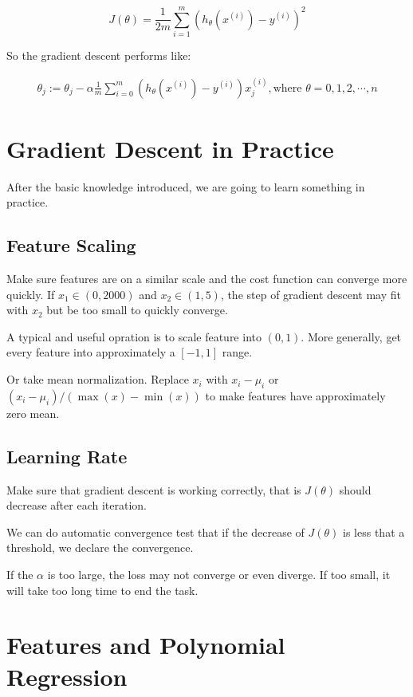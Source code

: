 \documentclass[en,11pt,english,black,simple]{../elegantbook}
\begin{document}
\[J(\theta) = \frac{1}{2m}\sum_{i=1}^m(h_\theta(x^(i)) - y^{(i)})^2\]

So the gradient descent performs like:

\[\begin{aligned}
    \theta_j := \theta_j - \alpha \frac{1}{m} \sum_{i = 0}^m (h_\theta(x^{(i)}) - y^{(i)})x_j^{(i)}, \text{where } \theta = 0, 1, 2, \cdots , n
\end{aligned}\]

\section{Gradient Descent in Practice}

After the basic knowledge introduced, we are going to learn something in practice.

\subsection{Feature Scaling}

Make sure features are on a similar scale and the cost function can converge more quickly. If \(x_1 \in (0, 2000)\) and \(x_2 \in (1, 5)\), the step of gradient descent may fit with \(x_2\) but be too small to quickly converge.

A typical and useful opration is to scale feature into \((0, 1)\). More generally, get every feature into approximately a \([-1, 1]\) range. 

Or take mean normalization. Replace \(x_i\) with \(x_i - \mu_i\) or \({(x_i - \mu_i)}/{(\max(x)-\min(x))}\) to make features have approximately zero mean. 

\subsection{Learning Rate}

Make sure that gradient descent is working correctly, that is \(J(\theta)\) should decrease after each iteration. 

We can do automatic convergence test that if the decrease of \(J(\theta)\)  is less that a threshold, we declare the convergence.

If the \(\alpha\) is  too large, the loss may not converge or even diverge. If too small, it will take too long time to end the task.

\section{Features and Polynomial Regression}
\end{document}
